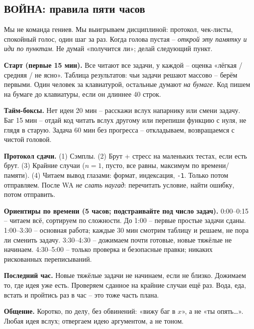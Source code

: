 \newcommand{\sq}{$\square$\ }
\subsection{ВОЙНА: правила пяти часов}
\par Мы не команда гениев. Мы выигрываем дисциплиной: протокол, чек-листы, спокойный голос, один шаг за раз. Когда голова пустая -- \emph{открой эту памятку и иди по пунктам}. Не думай «получится ли»; делай следующий пункт.
\par \textbf{Старт (первые 15 мин).} Все читают все задачи, у каждой -- оценка «лёгкая / средняя / не ясно». Таблица результатов: чьи задачи решают массово -- берём первыми. Один человек за клавиатурой, остальные думают \emph{на бумаге}. Код пишем на бумаге до клавиатуры, если он длиннее 40 строк.
\par \textbf{Тайм-боксы.} Нет идеи 20 мин -- расскажи вслух напарнику или смени задачу. Баг 15 мин -- отдай код читать вслух другому или перепиши функцию с нуля, не глядя в старую. Задача 60 мин без прогресса -- откладываем, возвращаемся с чистой головой.
\par \textbf{Протокол сдачи.} (1) Сэмплы. (2) Брут + стресс на маленьких тестах, если есть брут. (3) Крайние случаи ($n=1$, пусто, все равны, максимум по времени/памяти). (4) Читаем вывод глазами: формат, индексация, \texttt{-1}. Только потом отправляем. После WA \emph{не слать наугад}: перечитать условие, найти ошибку, потом отправить.
\par \textbf{Ориентиры по времени (5 часов; подстраивайте под число задач).} 0:00--0:15 -- читаем всё, сортируем по сложности. До 1:00 -- первые простые задачи сданы. 1:00--3:30 -- основная работа; каждые 30 мин смотрим таблицу и решаем, не пора ли сменить задачу. 3:30--4:30 -- дожимаем почти готовые, новые тяжёлые не начинаем. 4:30--5:00 -- только проверка и безопасные правки; никаких рискованных переписываний.
\par \textbf{Последний час.} Новые тяжёлые задачи не начинаем, если не близко. Дожимаем то, где идея уже есть. Проверяем сданное на крайние случаи ещё раз. Вода, еда, встать и пройтись раз в час -- это тоже часть плана.
\par \textbf{Общение.} Коротко, по делу, без обвинений: «вижу баг в $x$», а не «ты опять…». Любая идея вслух; отвергаем идею аргументом, а не тоном.
